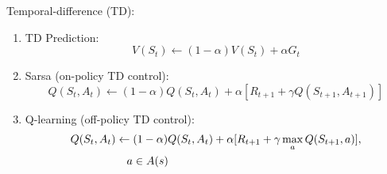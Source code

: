 \documentclass{article}
\begin{document}
Temporal-difference (TD):
\begin{enumerate}
\item TD Prediction:
    \begin{equation}
    V(S_t) \leftarrow (1 - \alpha) V(S_t) + \alpha G_t
    \end{equation}
\item Sarsa (on-policy TD control):
    \begin{equation}
    Q(S_t, A_t) \leftarrow (1 - \alpha) Q(S_t, A_t) + 
    \alpha [R_{t+1} + \gamma Q(S_{t+1}, A_{t+1})]
    \end{equation}
\item Q-learning (off-policy TD control):
    \begin{align}
    Q(S_t, A_t) &\leftarrow (1 - \alpha) Q(S_t, A_t) + 
    \alpha [R_{t+1} + \gamma \max_{a} Q(S_{t+1}, a)], \\
    &\quad a \in A(s) \notag
    \end{align}
\end{enumerate}
\end{document}
